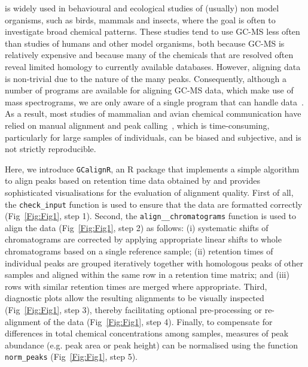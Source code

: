 \documentclass[10pt,letterpaper]{article}
\begin{document}
 is widely used in behavioural and ecological studies of (usually) non model organisms, such as birds, mammals and insects, where the goal is often to investigate broad chemical patterns. These studies tend to use GC-MS less often than studies of humans and other model organisms, both because GC-MS is relatively expensive and because many of the chemicals that are resolved often reveal limited homology to currently available databases. However, aligning  data is non-trivial due to the  nature of the many peaks. Consequently, although a number of programs are available for aligning GC-MS data, which make use of  mass spectrograms, we are only aware of a single program that can handle  data~\cite{Dellicour.2013}.  As a result, most studies of mammalian and avian chemical communication have relied on manual alignment and peak calling~\cite{Drea.2013}, which is time-consuming, particularly for large samples of individuals, can be biased and subjective, and is not strictly reproducible. \par
Here, we introduce \texttt{GCalignR}, an R package that implements a simple algorithm to align peaks based on retention time data obtained by  and provides sophisticated visualisations for the evaluation of alignment quality. First of all, the \texttt{check\_input} function is used to ensure that the data are formatted correctly (Fig~\ref{Fig:Fig1}, step 1). Second, the \texttt{align\_\_chromatograms} function is used to align the data (Fig~\ref{Fig:Fig1}, step 2) as follows: (i) systematic shifts of chromatograms are corrected by applying appropriate linear shifts to whole chromatograms based on a single reference sample; (ii) retention times of individual peaks are grouped iteratively together with homologous peaks of other samples and aligned within the same row in a retention time matrix; and (iii) rows with similar retention times are merged where appropriate. Third, diagnostic plots allow the resulting alignments to be visually inspected (Fig~\ref{Fig:Fig1}, step 3), thereby facilitating optional pre-processing or re-alignment of the data (Fig~\ref{Fig:Fig1}, step 4). Finally, to compensate for differences in total chemical concentrations among samples, measures of peak abundance (e.g. peak area or peak height) can be normalised using the function \texttt{norm\_peaks} (Fig~\ref{Fig:Fig1}, step 5). \par
\end{document}
